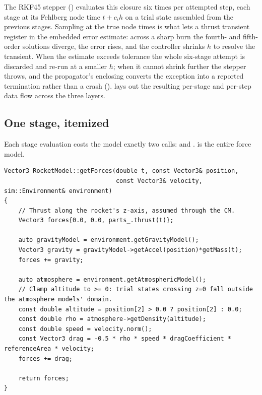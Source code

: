 The RKF45 stepper () evaluates this closure six times per
attempted step, each stage at its Fehlberg node time $t + c_i h$ on a trial state assembled from
the previous stages. Sampling at the true node times is what lets a thrust transient register in
the embedded error estimate: across a sharp burn the fourth- and fifth-order solutions diverge,
the error rises, and the controller shrinks $h$ to resolve the transient. When the estimate
exceeds tolerance the whole six-stage attempt is discarded and re-run at a smaller $h$; when it
cannot shrink further the stepper throws, and the propagator's enclosing  converts the
exception into a reported termination rather than a crash ().
 lays out the resulting per-stage and per-step data flow across the three
layers.


\subsection{One stage, itemized}\label{sec:flight-stage}

Each stage evaluation costs the model exactly two calls:  and .
 is the entire force model.

\begin{listing}[htbp]
\begin{verbatim}
Vector3 RocketModel::getForces(double t, const Vector3& position,
                               const Vector3& velocity, sim::Environment& environment)
{
    // Thrust along the rocket's z-axis, assumed through the CM.
    Vector3 forces{0.0, 0.0, parts_.thrust(t)};

    auto gravityModel = environment.getGravityModel();
    Vector3 gravity = gravityModel->getAccel(position)*getMass(t);
    forces += gravity;

    auto atmosphere = environment.getAtmosphericModel();
    // Clamp altitude to >= 0: trial states crossing z=0 fall outside the atmosphere models' domain.
    const double altitude = position[2] > 0.0 ? position[2] : 0.0;
    const double rho = atmosphere->getDensity(altitude);
    const double speed = velocity.norm();
    const Vector3 drag = -0.5 * rho * speed * dragCoefficient * referenceArea * velocity;
    forces += drag;

    return forces;
}
\end{verbatim}
\caption{The 3-DOF force model (, comments elided). Thrust
and mass come from the part tree; gravity and density from the injected environment; drag
configuration from the model's own scalars.}\label{lst:flight-forces}
\end{listing}

